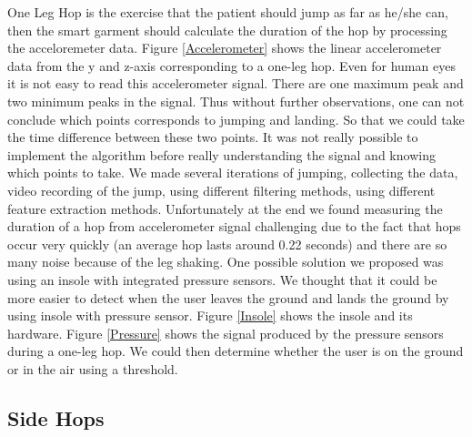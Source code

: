 One Leg Hop is the exercise that the patient should jump as far as he/she can, then the smart garment should calculate the duration of the hop by processing the acceloremeter data. 
Figure \ref{Accelerometer} shows the linear accelerometer data from the y and z-axis corresponding to a one-leg hop. Even for human eyes it is not easy to read this accelerometer signal. There are one maximum peak and two minimum peaks in the signal. Thus without further observations, one can not conclude which points corresponds to jumping and landing. So that we could take the time difference between these two points. It was not really possible to implement the algorithm before really understanding the signal and knowing which points to take. We made several iterations of jumping, collecting the data, video recording of the jump, using different filtering methods, using different feature extraction methods. Unfortunately at the end we found measuring the duration of a hop from accelerometer signal challenging due to the fact that hops occur very quickly (an average hop lasts around 0.22 seconds) and there are so many noise because of the leg shaking. One possible solution we proposed was using an insole with integrated pressure sensors. We thought that it could be more easier to detect when the user leaves the ground and lands the ground by using insole with pressure sensor. Figure \ref{Insole} shows the insole and its hardware. Figure \ref{Pressure} shows the signal produced by the pressure sensors during a one-leg hop. We could then determine whether the user is on the ground or in the air using a threshold. 


\subsection{	Side Hops}


